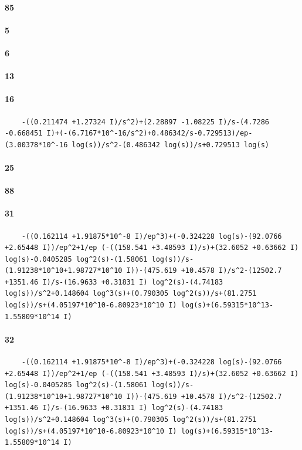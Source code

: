 \documentclass{article}
\begin{document}
\paragraph{85}
\paragraph{5}
\paragraph{6}
\paragraph{13}
\paragraph{16}
\begin{verbatim}
	-((0.211474 +1.27324 I)/s^2)+(2.28897 -1.08225 I)/s-(4.7286 -0.668451 I)+(-(6.7167*10^-16/s^2)+0.486342/s-0.729513)/ep-(3.00378*10^-16 log(s))/s^2-(0.486342 log(s))/s+0.729513 log(s)
\end{verbatim}
\paragraph{25}
\paragraph{88}
\paragraph{31}
\begin{verbatim}
	-((0.162114 +1.91875*10^-8 I)/ep^3)+(-0.324228 log(s)-(92.0766 +2.65448 I))/ep^2+1/ep (-((158.541 +3.48593 I)/s)+(32.6052 +0.63662 I) log(s)-0.0405285 log^2(s)-(1.58061 log(s))/s-(1.91238*10^10+1.98727*10^10 I))-(475.619 +10.4578 I)/s^2-(12502.7 +1351.46 I)/s-(16.9633 +0.31831 I) log^2(s)-(4.74183 log(s))/s^2+0.148604 log^3(s)+(0.790305 log^2(s))/s+(81.2751 log(s))/s+(4.05197*10^10-6.80923*10^10 I) log(s)+(6.59315*10^13-1.55809*10^14 I)
\end{verbatim}
\paragraph{32}
\begin{verbatim}
	-((0.162114 +1.91875*10^-8 I)/ep^3)+(-0.324228 log(s)-(92.0766 +2.65448 I))/ep^2+1/ep (-((158.541 +3.48593 I)/s)+(32.6052 +0.63662 I) log(s)-0.0405285 log^2(s)-(1.58061 log(s))/s-(1.91238*10^10+1.98727*10^10 I))-(475.619 +10.4578 I)/s^2-(12502.7 +1351.46 I)/s-(16.9633 +0.31831 I) log^2(s)-(4.74183 log(s))/s^2+0.148604 log^3(s)+(0.790305 log^2(s))/s+(81.2751 log(s))/s+(4.05197*10^10-6.80923*10^10 I) log(s)+(6.59315*10^13-1.55809*10^14 I)
\end{verbatim}
\end{document}

